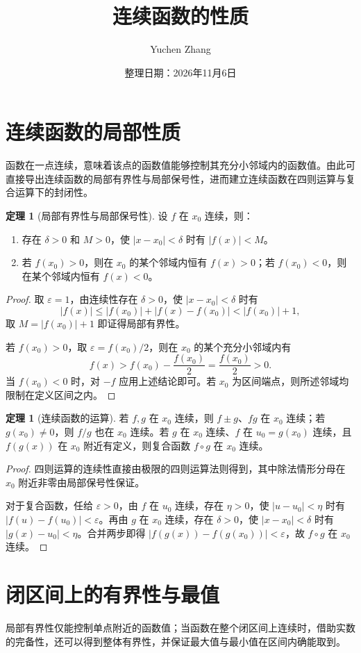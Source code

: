 \documentclass[UTF8,fontset=fandol,a4paper,12pt]{ctexart}
\title{连续函数的性质}
\author{Yuchen Zhang}
\date{整理日期：2026年11月6日}
\makeatletter
\theoremstyle{definition}
\newtheorem{theorem}[definition]{定理}
\renewcommand{\maketitle}{\begin{center}{\LARGE\bfseries\@title\par}\vspace{0.6em}\@author\par\vspace{0.2em}{\small\@date\par}\end{center}}
\makeatother
\begin{document}
\maketitle
\section{连续函数的局部性质}
函数在一点连续，意味着该点的函数值能够控制其充分小邻域内的函数值。由此可直接导出连续函数的局部有界性与局部保号性，进而建立连续函数在四则运算与复合运算下的封闭性。

\begin{theorem}[局部有界性与局部保号性]
设 $f$ 在 $x_0$ 连续，则：
\begin{enumerate}
\item 存在 $\delta>0$ 和 $M>0$，使 $|x-x_0|<\delta$ 时有 $|f(x)|<M$。
\item 若 $f(x_0)>0$，则在 $x_0$ 的某个邻域内恒有 $f(x)>0$；若 $f(x_0)<0$，则在某个邻域内恒有 $f(x)<0$。
\end{enumerate}
\end{theorem}
\begin{proof}
取 $\varepsilon=1$，由连续性存在 $\delta>0$，使 $|x-x_0|<\delta$ 时有
\[
 |f(x)|\le |f(x_0)|+|f(x)-f(x_0)|<|f(x_0)|+1,
\]
取 $M=|f(x_0)|+1$ 即证得局部有界性。

若 $f(x_0)>0$，取 $\varepsilon=f(x_0)/2$，则在 $x_0$ 的某个充分小邻域内有
\[
 f(x)>f(x_0)-\frac{f(x_0)}2=\frac{f(x_0)}2>0.
\]
当 $f(x_0)<0$ 时，对 $-f$ 应用上述结论即可。若 $x_0$ 为区间端点，则所述邻域均限制在定义区间之内。
\end{proof}

\begin{theorem}[连续函数的运算]
若 $f,g$ 在 $x_0$ 连续，则 $f\pm g$、$fg$ 在 $x_0$ 连续；若 $g(x_0)\ne0$，则 $f/g$ 也在 $x_0$ 连续。若 $g$ 在 $x_0$ 连续、$f$ 在 $u_0=g(x_0)$ 连续，且 $f(g(x))$ 在 $x_0$ 附近有定义，则复合函数 $f\circ g$ 在 $x_0$ 连续。
\end{theorem}
\begin{proof}
四则运算的连续性直接由极限的四则运算法则得到，其中除法情形分母在 $x_0$ 附近非零由局部保号性保证。

对于复合函数，任给 $\varepsilon>0$，由 $f$ 在 $u_0$ 连续，存在 $\eta>0$，使 $|u-u_0|<\eta$ 时有 $|f(u)-f(u_0)|<\varepsilon$。再由 $g$ 在 $x_0$ 连续，存在 $\delta>0$，使 $|x-x_0|<\delta$ 时有 $|g(x)-u_0|<\eta$。合并两步即得 $|f(g(x))-f(g(x_0))|<\varepsilon$，故 $f\circ g$ 在 $x_0$ 连续。
\end{proof}

\section{闭区间上的有界性与最值}
局部有界性仅能控制单点附近的函数值；当函数在整个闭区间上连续时，借助实数的完备性，还可以得到整体有界性，并保证最大值与最小值在区间内确能取到。
\end{document}
